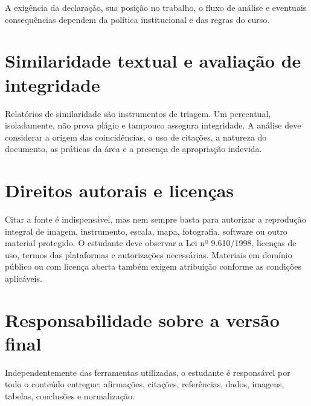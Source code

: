 \fluxopendente

A exigência da declaração, sua posição no trabalho, o fluxo de análise e eventuais consequências dependem da política institucional e das regras do curso.

\section{Similaridade textual e avaliação de integridade}

Relatórios de similaridade são instrumentos de triagem. Um percentual, isoladamente, não prova plágio e tampouco assegura integridade. A análise deve considerar a origem das coincidências, o uso de citações, a natureza do documento, as práticas da área e a presença de apropriação indevida.

\section{Direitos autorais e licenças}

Citar a fonte é indispensável, mas nem sempre basta para autorizar a reprodução integral de imagem, instrumento, escala, mapa, fotografia, software ou outro material protegido. O estudante deve observar a Lei nº 9.610/1998, licenças de uso, termos das plataformas e autorizações necessárias. Materiais em domínio público ou com licença aberta também exigem atribuição conforme as condições aplicáveis.

\section{Responsabilidade sobre a versão final}

Independentemente das ferramentas utilizadas, o estudante é responsável por todo o conteúdo entregue: afirmações, citações, referências, dados, imagens, tabelas, conclusões e normalização.


